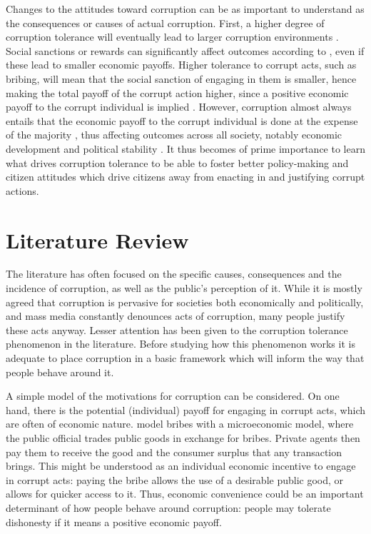 \documentclass[12pt,a4]{article}\usepackage[]{graphicx}\usepackage[]{xcolor}
\begin{document}
Changes to the attitudes toward corruption can be as important to understand as the consequences or causes of actual corruption. First, a higher degree of corruption tolerance will eventually lead to larger corruption environments \parencite{Campbell.2014}. Social sanctions or rewards can significantly affect outcomes according to \textcite{Akerlof.1980}, even if these lead to smaller economic payoffs. Higher tolerance to corrupt acts, such as bribing, will mean that the social sanction of engaging in them is smaller, hence making the total payoff of the corrupt action higher, since a positive economic payoff to the corrupt individual is implied \parencite{Shleifer.1993}. However, corruption almost always entails that the economic payoff to the corrupt individual is done at the expense of the majority \parencite{Warren.2004}, thus affecting outcomes across all society, notably economic development and political stability \parencite{Singer.2016}. It thus becomes of prime importance to learn what drives corruption tolerance to be able to foster better policy-making and citizen attitudes which drive citizens away from enacting in and justifying corrupt actions.








\section{Literature Review}

The literature has often focused on the specific causes, consequences and the incidence of corruption, as well as the public's perception of it. While it is mostly agreed that corruption is pervasive for societies both economically and politically, and mass media constantly denounces acts of corruption, many people justify these acts anyway. Lesser attention has been given to the corruption tolerance phenomenon in the literature. Before studying how this phenomenon works it is adequate to place corruption in a basic framework which will inform the way that people behave around it. 

A simple model of the motivations for corruption can be considered. On one hand, there is the potential (individual) payoff for engaging in corrupt acts, which are often of economic nature. \textcite{Shleifer.1993} model bribes with a microeconomic model, where the public official trades public goods in exchange for bribes. Private agents then pay them to receive the good and the consumer surplus that any transaction brings. This might be understood as an individual economic incentive to engage in corrupt acts: paying the bribe allows the use of a desirable public good, or allows for quicker access to it. Thus, economic convenience could be an important determinant of how people behave around corruption: people may tolerate dishonesty if it means a positive economic payoff. 
\end{document}
